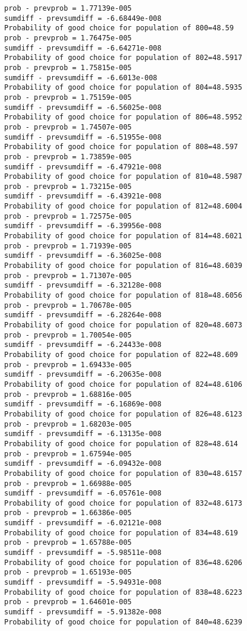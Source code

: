 \documentclass[11pt,onecolumn]{article}
\begin{document}
\begin{verbatim}
prob - prevprob = 1.77139e-005
sumdiff - prevsumdiff = -6.68449e-008
Probability of good choice for population of 800=48.59
prob - prevprob = 1.76475e-005
sumdiff - prevsumdiff = -6.64271e-008
Probability of good choice for population of 802=48.5917
prob - prevprob = 1.75815e-005
sumdiff - prevsumdiff = -6.6013e-008
Probability of good choice for population of 804=48.5935
prob - prevprob = 1.75159e-005
sumdiff - prevsumdiff = -6.56025e-008
Probability of good choice for population of 806=48.5952
prob - prevprob = 1.74507e-005
sumdiff - prevsumdiff = -6.51955e-008
Probability of good choice for population of 808=48.597
prob - prevprob = 1.73859e-005
sumdiff - prevsumdiff = -6.47921e-008
Probability of good choice for population of 810=48.5987
prob - prevprob = 1.73215e-005
sumdiff - prevsumdiff = -6.43921e-008
Probability of good choice for population of 812=48.6004
prob - prevprob = 1.72575e-005
sumdiff - prevsumdiff = -6.39956e-008
Probability of good choice for population of 814=48.6021
prob - prevprob = 1.71939e-005
sumdiff - prevsumdiff = -6.36025e-008
Probability of good choice for population of 816=48.6039
prob - prevprob = 1.71307e-005
sumdiff - prevsumdiff = -6.32128e-008
Probability of good choice for population of 818=48.6056
prob - prevprob = 1.70678e-005
sumdiff - prevsumdiff = -6.28264e-008
Probability of good choice for population of 820=48.6073
prob - prevprob = 1.70054e-005
sumdiff - prevsumdiff = -6.24433e-008
Probability of good choice for population of 822=48.609
prob - prevprob = 1.69433e-005
sumdiff - prevsumdiff = -6.20635e-008
Probability of good choice for population of 824=48.6106
prob - prevprob = 1.68816e-005
sumdiff - prevsumdiff = -6.16869e-008
Probability of good choice for population of 826=48.6123
prob - prevprob = 1.68203e-005
sumdiff - prevsumdiff = -6.13135e-008
Probability of good choice for population of 828=48.614
prob - prevprob = 1.67594e-005
sumdiff - prevsumdiff = -6.09432e-008
Probability of good choice for population of 830=48.6157
prob - prevprob = 1.66988e-005
sumdiff - prevsumdiff = -6.05761e-008
Probability of good choice for population of 832=48.6173
prob - prevprob = 1.66386e-005
sumdiff - prevsumdiff = -6.02121e-008
Probability of good choice for population of 834=48.619
prob - prevprob = 1.65788e-005
sumdiff - prevsumdiff = -5.98511e-008
Probability of good choice for population of 836=48.6206
prob - prevprob = 1.65193e-005
sumdiff - prevsumdiff = -5.94931e-008
Probability of good choice for population of 838=48.6223
prob - prevprob = 1.64601e-005
sumdiff - prevsumdiff = -5.91382e-008
Probability of good choice for population of 840=48.6239

\end{verbatim}
\end{document}
